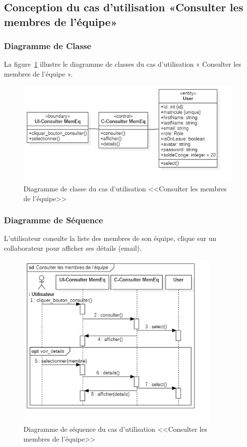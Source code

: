 \subsection{Conception du cas d’utilisation «Consulter les membres de l’équipe»}
\subsubsection{Diagramme de Classe}
La figure~\ref{fig:c_cmemeq} illustre le diagramme de classes du cas d'utilisation « Consulter les membres de l’équipe ».
\begin{figure}[h]
     \centering
     \includegraphics[width=13cm]{images/c_cmemeq.jpg}
     \caption{Diagramme de classe du cas d'utilisation <<Consulter les membres de l’équipe>>}
     \label{fig:c_cmemeq}
\end{figure}
\subsubsection{Diagramme de Séquence}
L'utilisateur consulte la liste des membres de son équipe, clique sur un collaborateur pour afficher ses détails (email).
\begin{figure}[ht]
    \centering
    \includegraphics[width=10cm, height=0.8\textheight, keepaspectratio]{images/s_cmemeq.jpg}
    \caption{Diagramme de séquence du cas d'utilisation <<Consulter les membres de l’équipe>>}
    \label{fig:S_cmemeq}
\end{figure}

